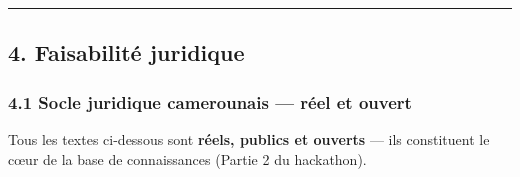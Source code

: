 \documentclass[
]{article}
\begin{document}
\begin{center}\rule{0.5\linewidth}{0.5pt}\end{center}

\subsection{4. Faisabilité juridique}\label{faisabilituxe9-juridique}

\subsubsection{4.1 Socle juridique camerounais --- réel et
ouvert}\label{socle-juridique-camerounais-ruxe9el-et-ouvert}

Tous les textes ci-dessous sont \textbf{réels, publics et ouverts} ---
ils constituent le cœur de la base de connaissances (Partie 2 du
hackathon).
\end{document}
